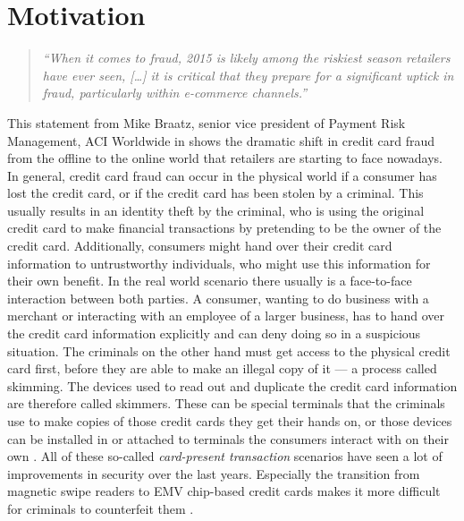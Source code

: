 
\section{Motivation}
\label{sec:motivation}

\begin{quotation}
    \textit{\enquote{When it comes to fraud, 2015 is likely among the riskiest season retailers have ever seen, […]
    it is critical that they prepare for a significant uptick in fraud, particularly within e-commerce channels.} \citep{Reuters2015}}
\end{quotation}

This statement from Mike Braatz, senior vice president of Payment Risk Management, ACI Worldwide in \citep{Reuters2015} shows the dramatic shift in credit card fraud from the offline to the online world that retailers are starting to face nowadays. \\

In general, credit card fraud can occur in the physical world if a consumer has lost the credit card, or if the credit card has been stolen by a criminal. This usually results in an identity theft by the criminal, who is using the original credit card to make financial transactions by pretending to be the owner of the credit card. Additionally, consumers might hand over their credit card information to untrustworthy individuals, who might use this information for their own benefit. In the real world scenario there usually is a face-to-face interaction between both parties. A consumer, wanting to do business with a merchant or interacting with an employee of a larger business, has to hand over the credit card information explicitly and can deny doing so in a suspicious situation. The criminals on the other hand must get access to the physical credit card first, before they are able to make an illegal copy of it --- a process called skimming. The devices used to read out and duplicate the credit card information are therefore called skimmers. These can be special terminals that the criminals use to make copies of those credit cards they get their hands on, or those devices can be installed in or attached to terminals the consumers interact with on their own \citep{ConsumerAction2009}. All of these so-called \emph{card-present transaction} scenarios have seen a lot of improvements in security over the last years. Especially the transition from magnetic swipe readers to \gls{EMV} chip-based credit cards makes it more difficult for criminals to counterfeit them \citep{Lewis2015}. \\

